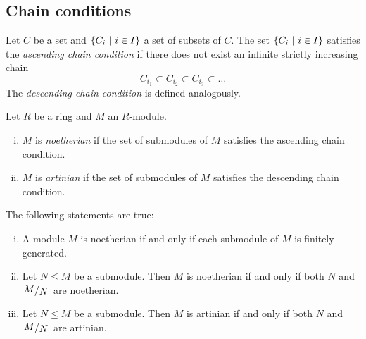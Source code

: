 \newpage

\subsection{Chain conditions}

\begin{definicija}
Let $C$ be a set and $\left\{C_i~\middle\vert~i \in I\right\}$ a set of subsets of $C$.
The set $\left\{C_i~\middle\vert~i \in I\right\}$ satisfies the
\emph{ascending chain condition}
if there does not exist an infinite strictly increasing chain
\[
C_{i_1} \subset C_{i_2} \subset C_{i_3} \subset \dots
\]
The
\emph{descending chain condition}
is defined analogously.
\end{definicija}

\begin{definicija}
Let $R$ be a ring and $M$ an $R$-module.

\begin{enumerate}[i)]
\item $M$ is \emph{noetherian} if the set
of submodules of $M$ satisfies the ascending chain condition.
\item $M$ is \emph{artinian} if the set of
submodules of $M$ satisfies the descending chain condition.
\end{enumerate}
\end{definicija}

\begin{trditev}
The following statements are true:

\begin{enumerate}[i)]
\item A module $M$ is noetherian if and only if each submodule of
$M$ is finitely generated.
\item Let $N \leq M$ be a submodule. Then $M$ is noetherian if and
only if both $N$ and $\kvoc{M}{N}$ are noetherian.
\label{fin_wed:prop:noet}
\item Let $N \leq M$ be a submodule. Then $M$ is artinian if and
only if both $N$ and $\kvoc{M}{N}$ are artinian.
\end{enumerate}
\end{trditev}

